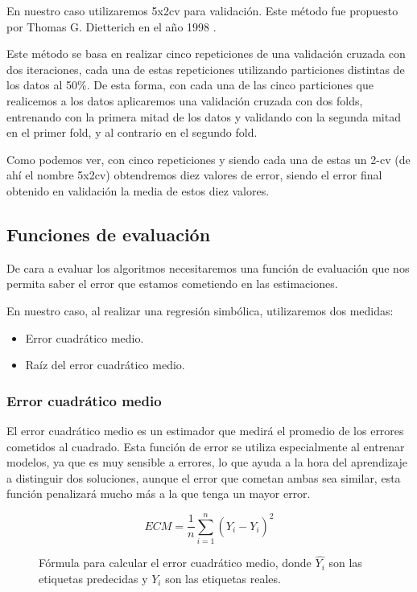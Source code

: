 En nuestro caso utilizaremos 5x2cv para validación. Este método fue propuesto por Thomas G. Dietterich en el año 1998 \cite{propuesta5x2cv}.

Este método se basa en realizar cinco repeticiones de una validación cruzada con dos iteraciones, cada una de estas repeticiones utilizando particiones distintas de los datos al 50\%. De esta forma, con cada una de las cinco particiones que realicemos a los datos aplicaremos una validación cruzada con dos folds, entrenando con la primera mitad de los datos y validando con la segunda mitad en el primer fold, y al contrario en el segundo fold.

Como podemos ver, con cinco repeticiones y siendo cada una de estas un 2-cv (de ahí el nombre 5x2cv) obtendremos diez valores de error, siendo el error final obtenido en validación la media de estos diez valores.



\newpage

\subsection{Funciones de evaluación}

De cara a evaluar los algoritmos necesitaremos una función de evaluación que nos permita saber el error que estamos cometiendo en las estimaciones.

En nuestro caso, al realizar una regresión simbólica, utilizaremos dos medidas:

\begin{itemize}
	\item Error cuadrático medio.
	\item Raíz del error cuadrático medio.
\end{itemize}

\subsubsection{Error cuadrático medio}

El error cuadrático medio es un estimador que medirá el promedio de los errores cometidos al cuadrado. Esta función de error se utiliza especialmente al entrenar modelos, ya que es muy sensible a errores, lo que ayuda a la hora del aprendizaje a distinguir dos soluciones, aunque el error que cometan ambas sea similar, esta función penalizará mucho más a la que tenga un mayor error.

\begin{figure}[H]
	 \centering
	 $$ ECM = \frac{1}{n} \sum_{i = 1}^{n}(\hat{Y_i} - Y_i)^2 $$
	 \caption{Fórmula para calcular el error cuadrático medio, donde $\hat{Y_i}$ son las etiquetas predecidas y $Y_i$ son las etiquetas reales.}
	\label{fig:ECM}
\end{figure}

